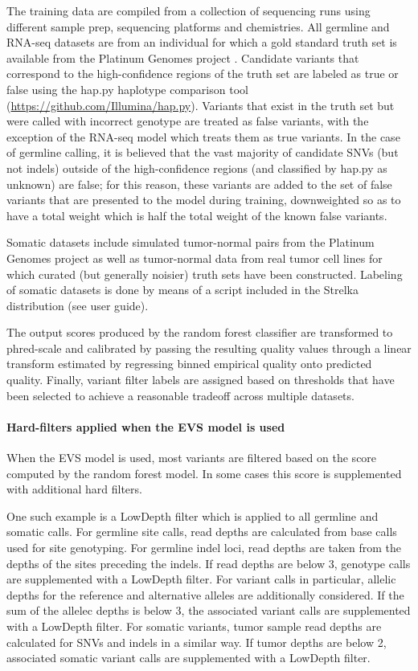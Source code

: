 \documentclass{article}
\begin{document}
The training data are compiled from a collection of sequencing runs using different sample prep, sequencing platforms and chemistries. All germline and RNA-seq datasets are from an individual for which a gold standard truth set is available from the Platinum Genomes project \cite{eberle2017}. Candidate variants that correspond to the high-confidence regions of the truth set are labeled as true or false using the hap.py haplotype comparison tool (\url{https://github.com/Illumina/hap.py}). Variants that exist in the truth set but were called with incorrect genotype are treated as false variants, with the exception of the RNA-seq model which treats them as true variants. In the case of germline calling, it is believed that the vast majority of candidate SNVs (but not indels) outside of the high-confidence regions (and classified by hap.py as unknown) are false; for this reason, these variants are added to the set of false variants that are presented to the model during training, downweighted so as to have a total weight which is half the total weight of the known false variants.

Somatic datasets include simulated tumor-normal pairs from the Platinum Genomes project as well as tumor-normal data from real tumor cell lines for which curated (but generally noisier) truth sets have been constructed. Labeling of somatic datasets is done by means of a script included in the Strelka distribution (see user guide).

The output scores produced by the random forest classifier are transformed to phred-scale and calibrated by passing the resulting quality values through a linear transform estimated by regressing binned empirical quality onto predicted quality. Finally, variant filter labels are assigned based on thresholds that have been selected to achieve a reasonable tradeoff across multiple datasets.

\paragraph{Hard-filters applied when the EVS model is used}

When the EVS model is used, most variants are filtered based on the score computed by the random forest model. In some cases this score is supplemented with additional hard filters.

One such example is a LowDepth filter which is applied to all germline and somatic calls. For germline site calls, read depths are calculated from base calls used for site genotyping. For germline indel loci, read depths are taken from the depths of the sites preceding the indels. If read depths are below 3, genotype calls are supplemented with a LowDepth filter. For variant calls in particular, allelic depths for the reference and alternative alleles are additionally considered. If the sum of the allelec depths is below 3, the associated variant calls are supplemented with a LowDepth filter. For somatic variants, tumor sample read depths are calculated for SNVs and indels in a similar way. If tumor depths are below 2, associated somatic variant calls are supplemented with a LowDepth filter.
\end{document}
